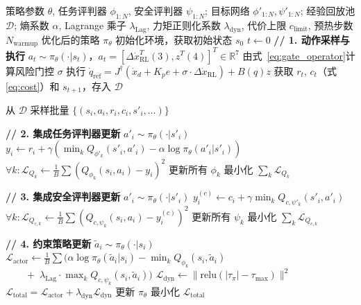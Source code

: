 \documentclass[10pt,conference]{IEEEtran}
\begin{document}
\begin{algorithm}[htbp]
\caption{零空间策略的约束 SAC（CSAC）算法}
\label{alg:sac_nullspace}
\begin{algorithmic}[1]\small
\Require 策略参数 $\theta$, 任务评判器 $\phi_{1:N}$, 安全评判器 $\psi_{1:N}$; 目标网络 $\phi'_{1:N},\psi'_{1:N}$; 经验回放池 $\mathcal{D}$; 熵系数 $\alpha$, Lagrange 乘子 $\lambda_{\text{Lag}}$, 力矩正则化系数 $\lambda_{\text{dyn}}$, 代价上限 $c_{\text{limit}}$, 预热步数 $N_{\text{warmup}}$
\Ensure 优化后的策略 $\pi_\theta$
\State 初始化环境，获取初始状态 $s_0$
\State $t \gets 0$
    \State \textbf{// 1. 动作采样与执行}
    \State $a_t \sim \pi_\theta(\cdot | s_t)$，$a_t = [\Delta \dot{x}_{\text{RL}}^T (3), z^T (4)]^T \in \mathbb{R}^7$
    \State 由式~\eqref{eq:gate_operator}计算风险门控 $\sigma$
    \State 执行 $\dot{q}_{\text{ref}} = J^\dagger(\dot{x}_d + K_p e + \sigma \cdot \Delta\dot{x}_{\text{RL}}) + B(q)z$
    \State 获取 $r_t$, $c_t$（式\eqref{eq:cost}）和 $s_{t+1}$，存入 $\mathcal{D}$

        \State 从 $\mathcal{D}$ 采样批量 $\{(s_i, a_i, r_i, c_i, s'_i, \dots)\}$

        \State \textbf{// 2. 集成任务评判器更新}
        \State $a'_i \sim \pi_\theta(\cdot|s'_i)$
        \State $y_i \gets r_i + \gamma(\min_k Q_{\phi'_k}(s'_i, a'_i) - \alpha \log \pi_\theta(a'_i|s'_i))$
        \State $\forall k: \mathcal{L}_{Q_k} \gets \frac{1}{B}\sum (Q_{\phi_k}(s_i,a_i) - y_i)^2$
        \State 更新所有 $\phi_k$ 最小化 $\sum_k \mathcal{L}_{Q_k}$

        \State \textbf{// 3. 集成安全评判器更新}
        \State $a'_i \sim \pi_\theta(\cdot|s'_i)$
        \State $y_i^{(c)} \gets c_i + \gamma \min_k Q_{c,\psi'_k}(s'_i, a'_i)$
        \State $\forall k: \mathcal{L}_{Q_{c,k}} \gets \frac{1}{B}\sum (Q_{c,\psi_k}(s_i,a_i) - y_i^{(c)})^2$
        \State 更新所有 $\psi_k$ 最小化 $\sum_k \mathcal{L}_{Q_{c,k}}$

            \State \textbf{// 4. 约束策略更新}
            \State $\tilde{a}_i \sim \pi_\theta(\cdot|s_i)$
            \State $\mathcal{L}_{\text{actor}} \gets \frac{1}{B}\sum \big( \alpha \log \pi_\theta(\tilde{a}_i|s_i) - \min_k Q_{\phi_k}(s_i,\tilde{a}_i)$
            \State $\qquad +\; \lambda_{\text{Lag}} \cdot \max_k Q_{c,\psi_k}(s_i,\tilde{a}_i) \big)$
            \State $\mathcal{L}_{\text{dyn}} \gets \|\text{relu}(|\tau_\pi| - \tau_{\max})\|^2$
            \State $\mathcal{L}_{\text{total}} = \mathcal{L}_{\text{actor}} + \lambda_{\text{dyn}} \mathcal{L}_{\text{dyn}}$
            \State 更新 $\pi_\theta$ 最小化 $\mathcal{L}_{\text{total}}$


\end{algorithmic}
\end{algorithm}
\end{document}
